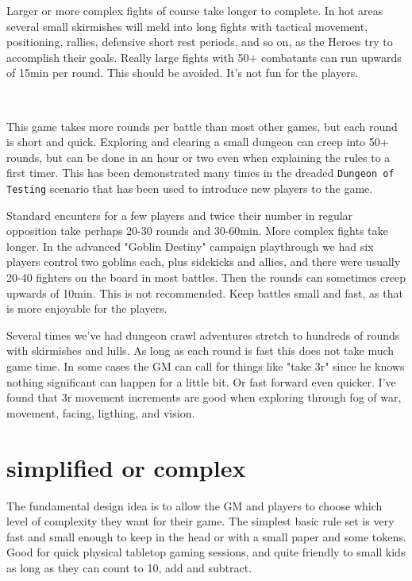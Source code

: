 Larger or more complex fights of course take longer to complete. In hot areas several small skirmishes will meld into long fights with tactical movement, positioning, rallies, defensive short rest periods, and so on, as the Heroes try to accomplish their goals.
Really large fights with 50+ combatants can run upwards of 15min per round. This should be avoided. It's not fun for the players.

\

This game takes more rounds per battle than most other games, but each round is short and quick. Exploring and clearing a small dungeon can creep into 50+ rounds, but can be done in an hour or two even when explaining the rules to a first timer. This has been demonstrated many times in the dreaded \texttt{Dungeon of Testing} scenario that has been used to introduce new players to the game.

Standard encunters for a few players and twice their number in regular opposition take perhaps 20-30 rounds and 30-60min. More complex fights take longer. In the advanced "Goblin Destiny" campaign playthrough we had six players control two goblins each, plus sidekicks and allies, and there were usually 20-40 fighters on the board in most battles. Then the rounds can sometimes creep upwards of 10min. This is not recommended. Keep battles small and fast, as that is more enjoyable for the players.

Several times we've had dungeon crawl adventures stretch to hundreds of rounds with skirmishes and lulls. As long as each round is fast this does not take much game time. In some cases the GM can call for things like "take 3r" since he knows nothing significant can happen for a little bit. Or fast forward even quicker. I've found that 3r movement increments are good when exploring through fog of war, movement, facing, ligthing, and vision.


\section*{simplified or complex}
The fundamental design idea is to allow the GM and players to choose which level of complexity they want for their game. The simplest basic rule set is very fast and small enough to keep in the head or with a small paper and some tokens. Good for quick physical tabletop gaming sessions, and quite friendly to small kids as long as they can count to 10, add and subtract.

